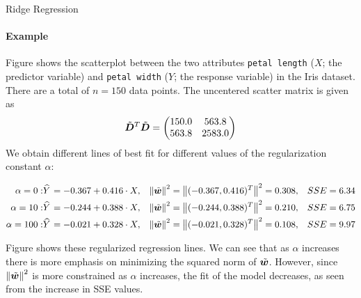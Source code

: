 %
%
%
%
\begin{frame}{Ridge Regression}
\framesubtitle{Example}
    Figure%
shows the scatterplot between
    the two attributes {\tt petal length} ($X$; the predictor variable) and 
    {\tt petal width} ($Y$; the response variable) in the
    Iris dataset. There are a total of $n=150$ data points.
    The uncentered scatter matrix is given as
    \begin{align*}
        \tilde{{\boldsymbol D}}^T\tilde{{\boldsymbol D}} = \begin{pmatrix} 
        150.0 &  563.8\\
        563.8 & 2583.0\\
         \end{pmatrix}
    \end{align*}
We obtain different lines of best
    fit for different values of the regularization constant $\alpha$:
\begin{small}
    \begin{align*}
        \alpha = 0: & \mkern 1.5mu\widehat{\mkern-1.5muY}\mkern 1.5mu = -0.367 + 0.416 \cdot X, 
        & \left\lVert\tilde{{\boldsymbol w}}\right\rVert^2 & = \left\lVert(-0.367, 0.416)^T\right\rVert^2 = 0.308, 
        & SSE & = 6.34\\
        \alpha = 10: & \mkern 1.5mu\widehat{\mkern-1.5muY}\mkern 1.5mu = -0.244 + 0.388 \cdot X,
        & \left\lVert\tilde{{\boldsymbol w}}\right\rVert^2 & = \left\lVert(-0.244, 0.388)^T\right\rVert^2 = 0.210,
       & SSE & = 6.75 \\
       \alpha = 100: & \mkern 1.5mu\widehat{\mkern-1.5muY}\mkern 1.5mu = -0.021 + 0.328 \cdot X,
       & \left\lVert\tilde{{\boldsymbol w}}\right\rVert^2 & = \left\lVert(-0.021, 0.328)^T\right\rVert^2 = 0.108,
        & SSE & = 9.97
    \end{align*}
\end{small}
Figure shows these regularized regression
    lines.
    We can see that as $\alpha$ increases there is more emphasis on
    minimizing the squared norm of $\tilde{{\boldsymbol w}}$. However, since $\left\lVert\tilde{{\boldsymbol w}}\right\rVert^2$ is more
    constrained as $\alpha$ increases, the fit of the model decreases,
    as seen from the increase in SSE values.
\end{frame}
